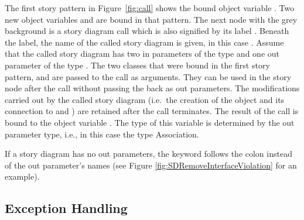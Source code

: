The first story pattern in Figure~\ref{fig:call} shows the bound object variable . Two new object variables  and  are bound in that pattern. The next node with the grey background is a story diagram call which is also signified by its label . Beneath the label, the name of the called story diagram is given, in this case . Assume that the called story diagram has two in parameters of the type  and one out parameter of the type . The two classes that were bound in the first story pattern,  and  are passed to the call as arguments. They can be used in the story node after the call without passing the back as out parameters. The modifications carried out by the called story diagram (i.e.\ the creation of the  object and its connection to  and ) are retained after the call terminates.
The result of the call is bound to the object variable . The type of this variable is determined by the out parameter type, i.e., in this case the type Association.

If a story diagram has no out parameters, the keyword  follows the colon instead of the out parameter's names (see Figure \ref{fig:SDRemoveInterfaceViolation} for an example).


{
\subsection{Exception Handling}
}


